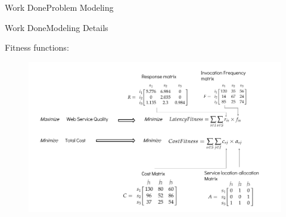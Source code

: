 \documentclass[10pt]{beamer}
\let\bbordermatrix\bordermatrix
\begin{document}
\begin{frame}{Work Done}{Problem Modeling}
\end{frame}
     


\begin{frame}{Work Done}{Modeling Details}

Fitness functions:
\begin{figure}
	\includegraphics[width=\linewidth]{./Feathergraphics/state10.png}
\end{figure}







\end{frame}
\end{document}
